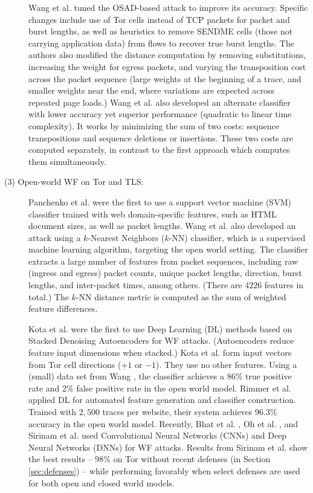 \documentclass[runningheads]{llncs}
\begin{document}
\begin{description}
Wang et al. \cite{wang2013improved} tuned the OSAD-based attack to improve its accuracy. Specific changes
include use of Tor cells instead of TCP packets for packet and burst lengths, as well as heuristics
to remove SENDME cells (those not carrying application data) from flows to recover true
burst lengths. The authors also modified the distance computation by removing substitutions,
increasing the weight for egress packets, and varying the transposition cost across the packet
sequence (large weights at the beginning of a trace, and smaller weights near the end, where
variations are expected across repeated page loads.) Wang et al. also developed an alternate classifier
with lower accuracy yet superior performance (quadratic to linear time complexity). It works by
minimizing the sum of two costs: sequence transpositions and sequence deletions or insertions. These
two costs are computed separately, in contrast to the first approach which computes them simultaneously.

\item [(3) Open-world WF on Tor and TLS:] Panchenko et al. \cite{panchenko2011website}
were the first to use a support vector machine (SVM) classifier trained with web domain-specific
features, such as HTML document sizes, as well as packet lengths.
Wang et al. \cite{wang2014effective} also developed an attack using a $k$-Nearest Neighbors ($k$-NN) classifier,
which is a supervised machine learning algorithm, targeting the open world setting. The classifier
extracts a large number of features from packet sequences, including raw (ingress and egress)
packet counts, unique packet lengths, direction, burst lengths, and inter-packet times, among others.
(There are $4226$ features in total.) The $k$-NN distance metric is computed as the sum of weighted
feature differences.


Kota et al. \cite{abe2016fingerprinting} were the first to use Deep Learning (DL) methods based on Stacked
Denoising Autoencoders for WF attacks. (Autoencoders reduce feature input dimensions when stacked.)
Kota et al. form input vectors from Tor cell directions ($+1$ or $-1$). They use no other features.
Using a (small) data set from Wang \cite{wang2016website}, the classifier achieves a $86\%$ true positive
rate and $2\%$ false positive rate in the open world model. Rimmer et al. \cite{rimmer2018automated}
applied DL for automated feature generation and classifier construction. Trained with $2,500$ traces per
website, their system achieves $96.3\%$ accuracy in the open world model.
Recently, Bhat et al. \cite{bhat2018var}, Oh et al. \cite{oh2017pfp}, and Sirinam et al. \cite{sirinam2018deep}
used Convolutional Neural Networks (CNNs) and Deep Neural Networks (DNNs) for WF attacks. Results from
Sirinam et al. show the best results -- $98\%$ on Tor without recent defenses (in Section \ref{sec:defenses}) --
while performing favorably when select defenses are used for both open and closed world models.

\end{description}
\end{document}
